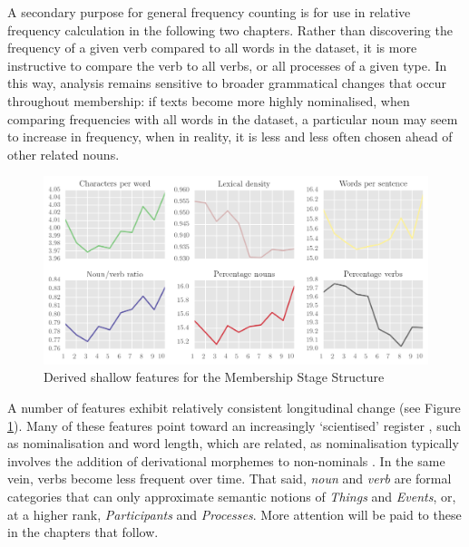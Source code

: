 A secondary purpose for general frequency counting is for use in relative frequency calculation in the following two chapters. Rather than discovering the frequency of a given verb compared to all words in the dataset, it is more instructive to compare the verb to all verbs, or all processes of a given type. In this way, analysis remains sensitive to broader grammatical changes that occur throughout membership: if texts become more highly nominalised, when comparing frequencies with all words in the dataset, a particular noun may seem to increase in frequency, when in reality, it is less and less often chosen ahead of other related nouns.


\begin{figure}[htb]
\centering
\includegraphics[width=\textwidth]{../images/derived-shallow-features-in-p-corpus.png}
\caption{Derived shallow features for the Membership Stage Structure}
\label{fig:derived_shallow_P}
\end{figure}

A number of features exhibit relatively consistent longitudinal change (see Figure \ref{fig:derived_shallow_P}). Many of these features point toward an increasingly `scientised' register \cite{harvey_disclosures_2012}, such as nominalisation and word length, which are related, as nominalisation typically involves the addition of derivational morphemes to non\hyp{}nominals \cite{simon-vandenbergen_grammatical_2003}. In the same vein, verbs become less frequent over time. That said, \emph{noun} and \emph{verb} are formal categories that can only approximate semantic notions of \emph{Things} and \emph{Events}, or, at a higher rank, \emph{Participants} and \emph{Processes}. More attention will be paid to these in the chapters that follow.

